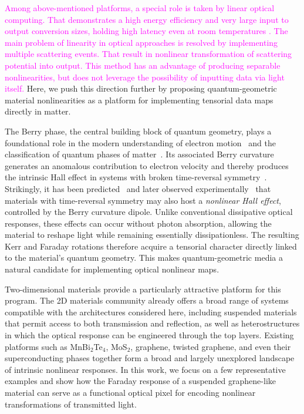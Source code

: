\documentclass[twocolumn,aps,prb,superscriptaddress,longbibliography]{revtex4-2}
\begin{document}
\textcolor{magenta}{Among above-mentioned platforms, a special role is taken by linear optical computing. That demonstrates a high energy efficiency and very large input to output conversion sizes, holding high latency even at room temperatures \cite{Yildirim2024,Xia2024,Wang2024NatureCommSc}. The main problem of linearity in optical approaches is resolved by implementing multiple scattering events. That result in nonlinear transformation of scattering potential into output. This method has an advantage of producing separable nonlinearities, but does not leverage the possibility of inputting data via light itself.} Here, we push this direction further by proposing quantum-geometric material nonlinearities as a platform for implementing tensorial data maps directly in matter. 

The Berry phase, the central building block of quantum geometry, plays a foundational role in the modern understanding of electron motion~\cite{RevModPhys.82.1959} and the classification of quantum phases of matter~\cite{RevModPhys.82.3045,RevModPhys.83.1057}. Its associated Berry curvature generates an anomalous contribution to electron velocity and thereby produces the intrinsic Hall effect in systems with broken time-reversal symmetry~\cite{RevModPhys.82.1539}. Strikingly, it has been predicted~\cite{2009arXiv0904.1917D,PhysRevLett.105.026805,PhysRevLett.115.216806} and later observed experimentally~\cite{2018arXiv180908744K,Ma2019,2019arXiv190202699S} that materials with time-reversal symmetry may also host a \textit{nonlinear Hall effect}, controlled by the Berry curvature dipole. Unlike conventional dissipative optical responses, these effects can occur without photon absorption, allowing the material to reshape light while remaining essentially dissipationless. The resulting Kerr and Faraday rotations therefore acquire a tensorial character directly linked to the material’s quantum geometry. This makes quantum-geometric media a natural candidate for implementing optical nonlinear maps.

Two-dimensional materials provide a particularly attractive platform for this program. The 2D materials community already offers a broad range of systems compatible with the architectures considered here, including suspended materials that permit access to both transmission and reflection, as well as heterostructures in which the optical response can be engineered through the top layers. Existing platforms such as MnBi$_2$Te$_4$, MoS$_2$, graphene, twisted graphene, and even their superconducting phases together form a broad and largely unexplored landscape of intrinsic nonlinear responses. In this work, we focus on a few representative examples and show how the Faraday response of a suspended graphene-like material can serve as a functional optical pixel for encoding nonlinear transformations of transmitted light.
\end{document}
